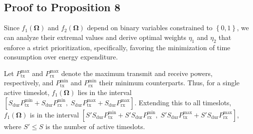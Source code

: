 \documentclass[10pt,journal,compsoc]{IEEEtran}
\makeatletter
\theoremstyle{myremark}
\theoremstyle{myexample}
\let\save@mathaccent\mathaccent
\newcommand*\if@single[3]{%
  \setbox0\hbox{${\mathaccent"0362{#1}}^H$}%
  \setbox2\hbox{${\mathaccent"0362{\kern0pt#1}}^H$}%
  \ifdim\ht0=\ht2 #3\else #2\fi
  }
\newcommand*\rel@kern[1]{\kern#1\dimexpr\macc@kerna}
\newcommand*\wideaccent[2]{\@ifnextchar^{{\wide@accent{#1}{#2}{0}}}{\wide@accent{#1}{#2}{1}}}
\newcommand*\wide@accent[3]{\if@single{#2}{\wide@accent@{#1}{#2}{#3}{1}}{\wide@accent@{#1}{#2}{#3}{2}}}
\newcommand*\wide@accent@[4]{%
  \begingroup
  \def\mathaccent##1##2{%
    \let\mathaccent\save@mathaccent
    \if#42 \let\macc@nucleus\first@char \fi
    \setbox\z@\hbox{$\macc@style{\macc@nucleus}_{}$}%
    \setbox\tw@\hbox{$\macc@style{\macc@nucleus}{}_{}$}%
    \dimen@\wd\tw@
    \advance\dimen@-\wd\z@
    \divide\dimen@ 3
    \@tempdima\wd\tw@
    \advance\@tempdima-\scriptspace
    \divide\@tempdima 10
    \advance\dimen@-\@tempdima
    \ifdim\dimen@>\z@ \dimen@0pt\fi
    \rel@kern{0.6}\kern-\dimen@
    \if#41
      #1{\rel@kern{-0.6}\kern\dimen@\macc@nucleus\rel@kern{0.4}\kern\dimen@}%
      \advance\dimen@0.4\dimexpr\macc@kerna
      \let\final@kern#3%
      \ifdim\dimen@<\z@ \let\final@kern1\fi
      \if\final@kern1 \kern-\dimen@\fi
    \else
      #1{\rel@kern{-0.6}\kern\dimen@#2}%
    \fi
  }%
  \macc@depth\@ne
  \let\math@bgroup\@empty \let\math@egroup\macc@set@skewchar
  \mathsurround\z@ \frozen@everymath{\mathgroup\macc@group\relax}%
  \macc@set@skewchar\relax
  \let\mathaccentV\macc@nested@a
  \if#41
    \macc@nested@a\relax111{#2}%
  \else
    \def\gobble@till@marker##1\endmarker{}%
    \futurelet\first@char\gobble@till@marker#2\endmarker
    \ifcat\noexpand\first@char A\else
      \def\first@char{}%
    \fi
    \macc@nested@a\relax111{\first@char}%
  \fi
  \endgroup
}
\newcommand\widebar{\wideaccent\overline}
\newcommand\scaleddot{\scalebox{.89}{.}}
\renewcommand{\ddddot}[1]{%
  {\mathop{\kern\z@#1}\limits^{\makebox[0pt][c]{\vbox to-2.2\ex@{\kern-\tw@\ex@
   \hbox{\normalfont\scaleddot\kern-0.5pt\scaleddot\kern-0.5pt\scaleddot\kern-0.5pt\scaleddot}\vss}}}}}
\makeatother
\begin{document}
\begin{appendices}





\setcounter{equation}{0}
\setcounter{table}{0}
\renewcommand{\theequation}{N.\arabic{equation}}
\section{Proof to Proposition 8} \label{app:proof-proposition-8}


Since $ f_1 \left( \boldsymbol{\Omega} \right) $ and $ f_2 \left( \boldsymbol{\Omega} \right) $ depend on binary variables constrained to $ \left\lbrace 0, 1 \right\rbrace  $, we can analyze their extremal values and derive optimal weights $ \eta_1 $ and $ \eta_2 $ that enforce a strict prioritization, specifically, favoring the minimization of time consumption over energy expenditure.

 
Let $ P_{\mathrm{tx}}^{\mathrm{max}} $ and $ P_{\mathrm{rx}}^{\mathrm{max}} $ denote the maximum transmit and receive powers, respectively, and $ P_{\mathrm{tx}}^{\mathrm{min}} $ and $ P_{\mathrm{rx}}^{\mathrm{min}} $ their minimum counterparts. Thus, for a single active timeslot, $ f_1 \left( \boldsymbol{\Omega} \right) $ lies in the interval $ \left[ S_\mathrm{dur} P_{\mathrm{tx}}^{\mathrm{min}} + S_\mathrm{dur} P_{\mathrm{rx}}^{\mathrm{min}}, \; S_\mathrm{dur} P_{\mathrm{tx}}^{\mathrm{max}} + S_\mathrm{dur} P_{\mathrm{rx}}^{\text{max}} \right] $. Extending this to all timeslots, $ f_1 \left( \boldsymbol{\Omega} \right) $ is in the interval $ \left[ S' S_\mathrm{dur} P_{\mathrm{tx}}^{\mathrm{min}} + S' S_\mathrm{dur} P_{\mathrm{rx}}^{\mathrm{min}}, \; S' S_\mathrm{dur} P_{\mathrm{tx}}^{\mathrm{max}} + S' S_\mathrm{dur}  P_{\mathrm{rx}}^{\text{max}} \right] $, where $ S' \leq S $ is the number of active timeslots. 


\end{appendices}
\end{document}
